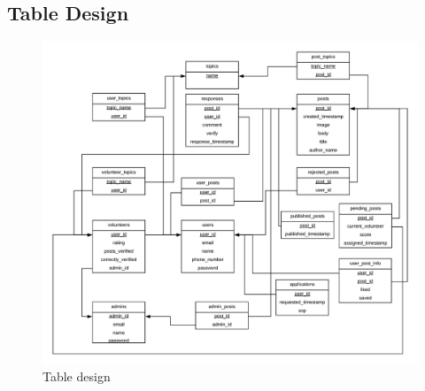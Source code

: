 \documentclass[titlepage,12pt]{article}
\begin{document}
\subsection{Table Design}
\begin{figure}[H]
    \centering
    \includegraphics[width=1.1\textwidth]{TableDesign.png}
    \caption{Table design}
    \label{fig:table_design}
\end{figure}
\end{document}
